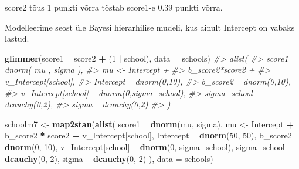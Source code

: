 \documentclass[]{book}
\newenvironment{Shaded}{\begin{snugshade}}{\end{snugshade}}
\newcommand{\CommentTok}[1]{\textcolor[rgb]{0.56,0.35,0.01}{\textit{#1}}}
\newcommand{\DataTypeTok}[1]{\textcolor[rgb]{0.13,0.29,0.53}{#1}}
\newcommand{\DecValTok}[1]{\textcolor[rgb]{0.00,0.00,0.81}{#1}}
\newcommand{\KeywordTok}[1]{\textcolor[rgb]{0.13,0.29,0.53}{\textbf{#1}}}
\newcommand{\NormalTok}[1]{#1}
\newcommand{\OperatorTok}[1]{\textcolor[rgb]{0.81,0.36,0.00}{\textbf{#1}}}
\newcommand{\StringTok}[1]{\textcolor[rgb]{0.31,0.60,0.02}{#1}}
\begin{document}
score2 tõus 1 punkti võrra tõstab score1-e 0.39 punkti võrra.

Modelleerime seost üle Bayesi hierarhilise mudeli, kus ainult Intercept on vabaks lastud.

\begin{Shaded}
\begin{Highlighting}[]
\KeywordTok{glimmer}\NormalTok{(score1 }\OperatorTok{~}\StringTok{ }\NormalTok{score2 }\OperatorTok{+}\StringTok{ }\NormalTok{(}\DecValTok{1} \OperatorTok{|}\StringTok{ }\NormalTok{school), }\DataTypeTok{data =}\NormalTok{ schools)}
\CommentTok{#> alist(}
\CommentTok{#>     score1 ~ dnorm( mu , sigma ),}
\CommentTok{#>     mu <- Intercept +}
\CommentTok{#>         b_score2*score2 +}
\CommentTok{#>         v_Intercept[school],}
\CommentTok{#>     Intercept ~ dnorm(0,10),}
\CommentTok{#>     b_score2 ~ dnorm(0,10),}
\CommentTok{#>     v_Intercept[school] ~ dnorm(0,sigma_school),}
\CommentTok{#>     sigma_school ~ dcauchy(0,2),}
\CommentTok{#>     sigma ~ dcauchy(0,2)}
\CommentTok{#> )}
\end{Highlighting}
\end{Shaded}

\begin{Shaded}
\begin{Highlighting}[]
\NormalTok{schoolm7 <-}\StringTok{ }\KeywordTok{map2stan}\NormalTok{(}\KeywordTok{alist}\NormalTok{(}
\NormalTok{    score1 }\OperatorTok{~}\StringTok{ }\KeywordTok{dnorm}\NormalTok{(mu, sigma),}
\NormalTok{    mu <-}\StringTok{ }\NormalTok{Intercept }\OperatorTok{+}
\StringTok{        }\NormalTok{b_score2 }\OperatorTok{*}\StringTok{ }\NormalTok{score2 }\OperatorTok{+}
\StringTok{        }\NormalTok{v_Intercept[school],}
\NormalTok{    Intercept }\OperatorTok{~}\StringTok{ }\KeywordTok{dnorm}\NormalTok{(}\DecValTok{50}\NormalTok{, }\DecValTok{50}\NormalTok{),}
\NormalTok{    b_score2 }\OperatorTok{~}\StringTok{ }\KeywordTok{dnorm}\NormalTok{(}\DecValTok{0}\NormalTok{, }\DecValTok{10}\NormalTok{),}
\NormalTok{    v_Intercept[school] }\OperatorTok{~}\StringTok{ }\KeywordTok{dnorm}\NormalTok{(}\DecValTok{0}\NormalTok{, sigma_school),}
\NormalTok{    sigma_school }\OperatorTok{~}\StringTok{ }\KeywordTok{dcauchy}\NormalTok{(}\DecValTok{0}\NormalTok{, }\DecValTok{2}\NormalTok{),}
\NormalTok{    sigma }\OperatorTok{~}\StringTok{ }\KeywordTok{dcauchy}\NormalTok{(}\DecValTok{0}\NormalTok{, }\DecValTok{2}\NormalTok{)}
\NormalTok{), }\DataTypeTok{data =}\NormalTok{ schools)}
\end{Highlighting}
\end{Shaded}
\end{document}
